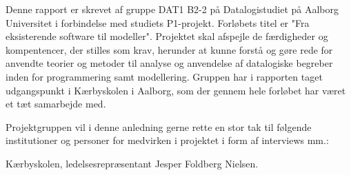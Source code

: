 Denne rapport er skrevet af gruppe DAT1 B2-2 på Datalogistudiet på Aalborg Universitet i forbindelse med studiets P1-projekt. Forløbets titel er "Fra eksisterende software til modeller". Projektet skal afspejle de færdigheder og kompentencer, der stilles som krav, herunder at kunne forstå og gøre rede for anvendte teorier og metoder til analyse og anvendelse af datalogiske begreber inden for programmering samt modellering. Gruppen har i rapporten taget udgangspunkt i Kærbyskolen i Aalborg, som der gennem hele forløbet har været et tæt samarbejde med.

Projektgruppen vil i denne anledning gerne rette en stor tak til følgende institutioner og personer for medvirken i projektet i form af interviews mm.:

Kærbyskolen, ledelsesrepræsentant Jesper Foldberg Nielsen.